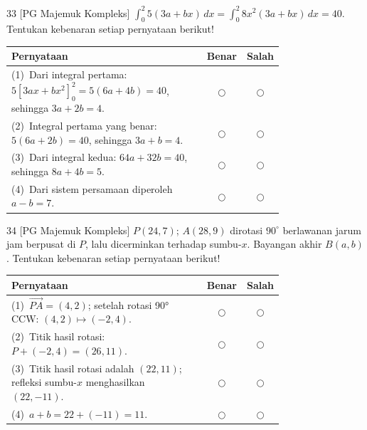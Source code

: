 \documentclass[11pt]{article}
\begin{document}
\begin{soal}{33 \normalfont\small[PG Majemuk Kompleks]}
$\displaystyle\int_0^2 5(3a+bx)\,dx=\int_0^2 8x^2(3a+bx)\,dx=40$.
Tentukan kebenaran setiap pernyataan berikut!

\par\smallskip
{\renewcommand{\arraystretch}{1.4}%
\begin{tabular}{@{}p{0.76\linewidth}cc@{}}
\hline\textbf{Pernyataan}&\textbf{Benar}&\textbf{Salah}\\\hline
(1)~Dari integral pertama: $5\!\left[3ax+bx^2\right]_0^2 = 5(6a+4b)=40$, sehingga $3a+2b=4$.&$\bigcirc$&$\bigcirc$\\
(2)~Integral pertama yang benar: $5(6a+2b)=40$, sehingga $3a+b=4$.&$\bigcirc$&$\bigcirc$\\
(3)~Dari integral kedua: $64a+32b=40$, sehingga $8a+4b=5$.&$\bigcirc$&$\bigcirc$\\
(4)~Dari sistem persamaan diperoleh $a-b=7$.&$\bigcirc$&$\bigcirc$\\\hline
\end{tabular}}
\end{soal}

\begin{soal}{34 \normalfont\small[PG Majemuk Kompleks]}
$P(24,7)$; $A(28,9)$ dirotasi $90^\circ$ berlawanan jarum jam berpusat di $P$,
lalu dicerminkan terhadap sumbu-$x$. Bayangan akhir $B(a,b)$.
Tentukan kebenaran setiap pernyataan berikut!

\par\smallskip
{\renewcommand{\arraystretch}{1.4}%
\begin{tabular}{@{}p{0.76\linewidth}cc@{}}
\hline\textbf{Pernyataan}&\textbf{Benar}&\textbf{Salah}\\\hline
(1)~$\overrightarrow{PA}=(4,2)$; setelah rotasi 90° CCW: $(4,2)\mapsto(-2,4)$.&$\bigcirc$&$\bigcirc$\\
(2)~Titik hasil rotasi: $P+(-2,4)=(26,11)$.&$\bigcirc$&$\bigcirc$\\
(3)~Titik hasil rotasi adalah $(22,11)$; refleksi sumbu-$x$ menghasilkan $(22,-11)$.&$\bigcirc$&$\bigcirc$\\
(4)~$a+b=22+(-11)=11$.&$\bigcirc$&$\bigcirc$\\\hline
\end{tabular}}
\end{soal}
\end{document}
